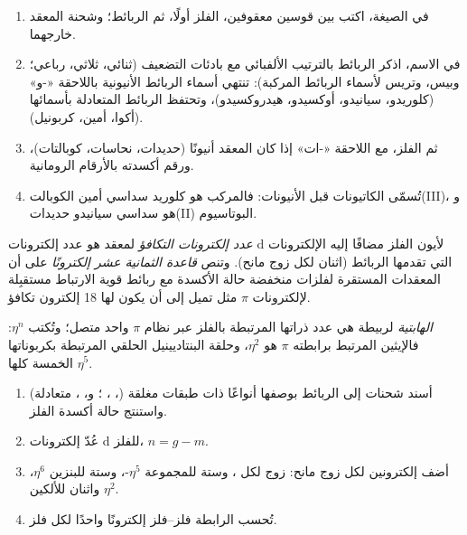 \begin{method}\label{met:b2:coordination-complexes:naming}
\begin{enumerate}
  \item في الصيغة، اكتب  بين قوسين معقوفين، الفلز
        أولًا، ثم الربائط؛ وشحنة المعقد خارجهما.
  \item في الاسم، اذكر الربائط بالترتيب الألفبائي مع بادئات
        التضعيف (ثنائي، ثلاثي، رباعي؛ وبيس، وتريس لأسماء الربائط المركبة): تنتهي أسماء الربائط
        الأنيونية باللاحقة «-و» (كلوريدو، سيانيدو، أوكسيدو، هيدروكسيدو)، وتحتفظ الربائط المتعادلة
        بأسمائها (أكوا، أمين، كربونيل).
  \item ثم الفلز، مع اللاحقة «-ات» إذا كان المعقد أنيونًا (حديدات،
        نحاسات، كوبالتات)، ورقم أكسدته بالأرقام الرومانية.
  \item تُسمّى الكاتيونات قبل الأنيونات: فالمركب  هو
        كلوريد سداسي أمين الكوبالت(III)، و هو
        سداسي سيانيدو حديدات(II) البوتاسيوم.
\end{enumerate}
\end{method}

\begin{definition}[عدّ الإلكترونات]\label{def:b2:coordination-complexes:electron-count}
\emph{عدد إلكترونات التكافؤ} لمعقد هو
عدد إلكترونات d لأيون الفلز مضافًا إليه الإلكترونات التي تقدمها الربائط (اثنان
لكل زوج مانح). وتنص \emph{قاعدة الثمانية عشر إلكترونًا} على أن
المعقدات المستقرة لفلزات منخفضة حالة الأكسدة مع ربائط قوية الارتباط مستقبِلة لإلكترونات $\pi$
مثل  تميل إلى أن يكون لها 18 إلكترون تكافؤ.
\end{definition}

\begin{definition}[الهابتية]\label{def:b2:coordination-complexes:hapticity}
\emph{الهابتية} لربيطة هي عدد ذراتها المرتبطة
بالفلز عبر نظام $\pi$ واحد متصل؛ وتُكتب $\eta^n$: فالإيثين المرتبط
برابطته $\pi$ هو $\eta^2$، وحلقة البنتاديينيل الحلقي المرتبطة بكربوناتها الخمسة كلها $\eta^5$.
\end{definition}

\begin{method}[عدّ الإلكترونات]\label{met:b2:coordination-complexes:electron-count}
\begin{enumerate}
  \item أسند شحنات إلى الربائط بوصفها أنواعًا ذات طبقات مغلقة (، ،
        ؛ و، ،  متعادلة) واستنتج حالة
        أكسدة الفلز.
  \item عُدّ إلكترونات d للفلز، $n = g - m$.
  \item أضف إلكترونين لكل زوج مانح: زوج لكل ، وستة للمجموعة
        $\eta^5$-، وستة للبنزين $\eta^6$، واثنان للألكين $\eta^2$.
  \item تُحسب الرابطة فلز--فلز إلكترونًا واحدًا لكل فلز.
\end{enumerate}
\end{method}

